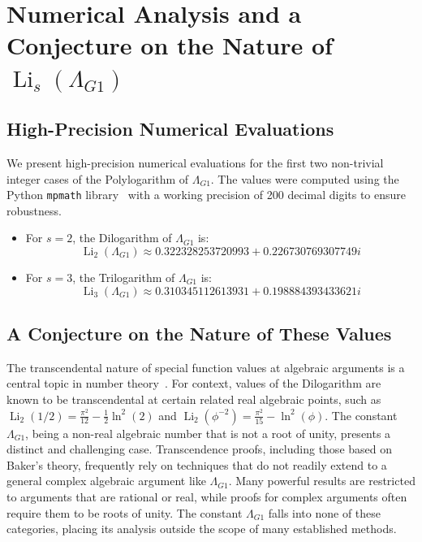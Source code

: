 \documentclass{amsart}
\theoremstyle{plain}
\theoremstyle{definition}
\theoremstyle{remark}
\DeclareMathOperator{\Li}{Li} %
\newcommand{\LambdaG}{\Lambda_{G1}}
\newcommand{\phiG}{\phi}
\begin{document}
\section{Numerical Analysis and a Conjecture on the Nature of \texorpdfstring{$\Li_s(\LambdaG)$}{Li\_s(Lambda\_G1)}}

\subsection{High-Precision Numerical Evaluations}
We present high-precision numerical evaluations for the first two non-trivial integer cases of the Polylogarithm of $\LambdaG$. The values were computed using the Python \texttt{mpmath} library~\cite{mpmath} with a working precision of 200 decimal digits to ensure robustness.
\begin{itemize}
    \item For $s=2$, the Dilogarithm of $\LambdaG$ is:
    \[ \Li_2(\LambdaG) \approx 0.322328253720993 + 0.226730769307749i \]
    
    \item For $s=3$, the Trilogarithm of $\LambdaG$ is:
    \[ \Li_3(\LambdaG) \approx 0.310345112613931 + 0.198884393433621i \]
    
\end{itemize}

\subsection{A Conjecture on the Nature of These Values}
The transcendental nature of special function values at algebraic arguments is a central topic in number theory~\cite{Baker}. For context, values of the Dilogarithm are known to be transcendental at certain related real algebraic points, such as $\Li_2(1/2) = \frac{\pi^2}{12} - \frac{1}{2}\ln^2(2)$ and $\Li_2(\phiG^{-2}) = \frac{\pi^2}{15} - \ln^2(\phiG)$. The constant $\LambdaG$, being a non-real algebraic number that is not a root of unity, presents a distinct and challenging case. Transcendence proofs, including those based on Baker's theory, frequently rely on techniques that do not readily extend to a general complex algebraic argument like $\LambdaG$. Many powerful results are restricted to arguments that are rational or real, while proofs for complex arguments often require them to be roots of unity. The constant $\LambdaG$ falls into none of these categories, placing its analysis outside the scope of many established methods.
\end{document}
